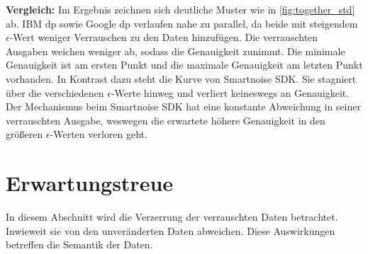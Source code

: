 \textbf{Vergleich: }
Im Ergebnis zeichnen sich deutliche Muster wie in \cref{fig:together_std} ab. IBM \gls{dp} sowie Google \gls{dp} verlaufen nahe zu parallel, da beide mit steigendem $\epsilon$-Wert weniger Verrauschen zu den Daten hinzufügen. Die verrauschten Ausgaben weichen weniger ab, sodass die Genauigkeit zunimmt. Die minimale Genauigkeit ist am ersten Punkt und die maximale Genauigkeit am letzten Punkt vorhanden. In Kontrast dazu steht die Kurve von Smartnoise SDK. Sie stagniert über die verschiedenen $\epsilon$-Werte hinweg und verliert keineswegs an Genauigkeit. Der Mechanismus beim Smartnoise SDK hat eine konstante Abweichung in seiner verrauschten Ausgabe, weswegen die erwartete höhere Genauigkeit in den größeren $\epsilon$-Werten verloren geht. 

\newpage
\section{Erwartungstreue}
In diesem Abschnitt wird die Verzerrung der verrauschten Daten betrachtet. Inwieweit sie von den unveränderten Daten abweichen. Diese Auswirkungen betreffen die Semantik der Daten.
